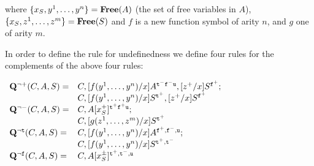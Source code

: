 \documentclass{\filespath jancl}
\def\free{\hbox{\bf Free}}
\def\Q{{\bf Q}}\def\R{{\bf R}}\def\S{{\bf S}}\def\T{{\bf T}}
\def\sdot{\rule{.3ex}{.3ex}\hspace{-0.4ex}\;} %
\def\ianc#1#2#3{{\lineskip 4pt\lowerhalf{\inruleanhelp{#1}{#2}{{\it #3}}%
                   \box\tempb\hskip\wd\tempd}}}
\def\lowerhalf#1{\hbox{\raise -0.8\baselineskip\hbox{#1}}}
\def\mud#1{\hfil $\displaystyle{#1}$\hfil}
\def\rig#1{\hfil $\displaystyle{#1}$}
\def\inruleanhelp#1#2#3{\setbox\tempa=\hbox{$\displaystyle{\mathstrut #2}$}%
                        \setbox\tempd=\hbox{$\; #3$}%
                        \setbox\tempb=\vbox{\halign{##\cr
        \mud{#1}\cr
        \noalign{\vskip\the\lineskip}%
        \noalign{\hrule height 0pt}%
        \rig{\vbox to 0pt{\vss\hbox to 0pt{\copy\tempd \hss}\vss}}\cr
        \noalign{\hrule}%
        \noalign{\vskip\the\lineskip}%
        \mud{\copy\tempa}\cr}}%
                      \tempc=\wd\tempb
                      \advance\tempc by \wd\tempa
                      \divide\tempc by 2 }
\def\rulespacing{\renewcommand{\arraystretch}{3} \arraycolsep 0em}
\newcommand{\Secure}{{\mathfrak S}}
\newcommand{\true}{{\sf t}}
\newcommand{\false}{{\sf f}}
\newcommand{\twts}{{{\sf t}^+}}
\newcommand{\twfs}{{{\sf f}^+}}
\newcommand{\twti}{{{\sf t}^-}}
\newcommand{\twfi}{{{\sf f}^-}}
\newcommand{\twu}{{\sf u}}
\def\sf{\tt}
\begin{document}
\begin{definition}
\noindent where $\{x_S,y^1,\ldots,y^n\}=\free(A)$ (the set of free
variables in $A$), $\{x_S,z^1,\ldots,z^m\}=\free(S)$ and $f$ is a new
function symbol of arity $n$, and $g$ one of arity $m$.

In order to define the rule for undefinedness we define four rules for
the complements of the above four rules: 

\(
\begin{array}{ll}
\Q^{\non +}(C,A,S) = & C, [f(y^1,\ldots,y^n)/x]A^{\twti\twfi\twu}, [z^+/x]S^\twfs;\\
                    &C, [f(y^1,\ldots,y^n)/x]S^{\twts}, [z^+/x]S^\twfs \\

\Q^{\non -}(C,A,S) = & C, A[x_S^+]^{\twts\twfs\twu};\\
                   & C, [g(z^1,\ldots,z^m)/x]S^\twts\\

\Q^{\non\true}(C,A,S) = & C, [f(y^1,\ldots,y^n)/x]A^{\twfs,\twfi,\twu};\\
                      &  C, [f(y^1,\ldots,y^n)/x]S^{\twts,\twti}\\
\Q^{\non\false}(C,A,S) = & C, A[x_S^\pm]^{\twts,\twti,\twu}\\

\end{array}
\)



\end{definition}
\end{document}

